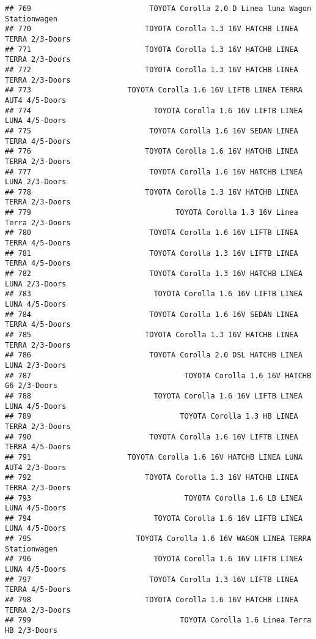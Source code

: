 \documentclass[]{article}
\begin{document}
\begin{verbatim}
## 769                           TOYOTA Corolla 2.0 D Linea luna Wagon Stationwagen
## 770                          TOYOTA Corolla 1.3 16V HATCHB LINEA TERRA 2/3-Doors
## 771                          TOYOTA Corolla 1.3 16V HATCHB LINEA TERRA 2/3-Doors
## 772                          TOYOTA Corolla 1.3 16V HATCHB LINEA TERRA 2/3-Doors
## 773                      TOYOTA Corolla 1.6 16V LIFTB LINEA TERRA AUT4 4/5-Doors
## 774                            TOYOTA Corolla 1.6 16V LIFTB LINEA LUNA 4/5-Doors
## 775                           TOYOTA Corolla 1.6 16V SEDAN LINEA TERRA 4/5-Doors
## 776                          TOYOTA Corolla 1.6 16V HATCHB LINEA TERRA 2/3-Doors
## 777                           TOYOTA Corolla 1.6 16V HATCHB LINEA LUNA 2/3-Doors
## 778                          TOYOTA Corolla 1.3 16V HATCHB LINEA TERRA 2/3-Doors
## 779                                 TOYOTA Corolla 1.3 16V Linea Terra 2/3-Doors
## 780                           TOYOTA Corolla 1.6 16V LIFTB LINEA TERRA 4/5-Doors
## 781                           TOYOTA Corolla 1.3 16V LIFTB LINEA TERRA 4/5-Doors
## 782                           TOYOTA Corolla 1.3 16V HATCHB LINEA LUNA 2/3-Doors
## 783                            TOYOTA Corolla 1.6 16V LIFTB LINEA LUNA 4/5-Doors
## 784                           TOYOTA Corolla 1.6 16V SEDAN LINEA TERRA 4/5-Doors
## 785                          TOYOTA Corolla 1.3 16V HATCHB LINEA TERRA 2/3-Doors
## 786                           TOYOTA Corolla 2.0 DSL HATCHB LINEA LUNA 2/3-Doors
## 787                                   TOYOTA Corolla 1.6 16V HATCHB G6 2/3-Doors
## 788                            TOYOTA Corolla 1.6 16V LIFTB LINEA LUNA 4/5-Doors
## 789                                  TOYOTA Corolla 1.3 HB LINEA TERRA 2/3-Doors
## 790                           TOYOTA Corolla 1.6 16V LIFTB LINEA TERRA 4/5-Doors
## 791                      TOYOTA Corolla 1.6 16V HATCHB LINEA LUNA AUT4 2/3-Doors
## 792                          TOYOTA Corolla 1.3 16V HATCHB LINEA TERRA 2/3-Doors
## 793                                   TOYOTA Corolla 1.6 LB LINEA LUNA 4/5-Doors
## 794                            TOYOTA Corolla 1.6 16V LIFTB LINEA LUNA 4/5-Doors
## 795                        TOYOTA Corolla 1.6 16V WAGON LINEA TERRA Stationwagen
## 796                            TOYOTA Corolla 1.6 16V LIFTB LINEA LUNA 4/5-Doors
## 797                           TOYOTA Corolla 1.3 16V LIFTB LINEA TERRA 4/5-Doors
## 798                          TOYOTA Corolla 1.6 16V HATCHB LINEA TERRA 2/3-Doors
## 799                                  TOYOTA Corolla 1.6 Linea Terra HB 2/3-Doors

\end{verbatim}
\end{document}
